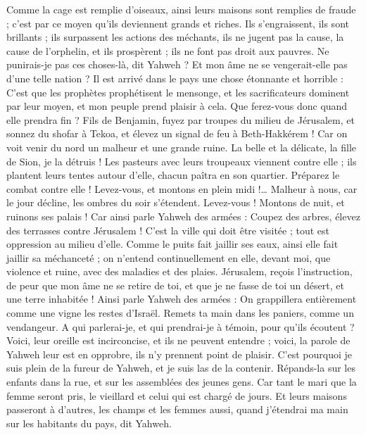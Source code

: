 \begin{multicols}{2}
Comme la cage est remplie d'oiseaux, ainsi leurs maisons sont remplies de fraude ; c'est par ce moyen qu'ils deviennent grands et riches.
Ils s'engraissent, ils sont brillants ; ils surpassent les actions des méchants, ils ne jugent pas la cause, la cause de l'orphelin, et ils prospèrent ; ils ne font pas droit aux pauvres.
Ne punirais-je pas ces choses-là, dit Yahweh ? Et mon âme ne se vengerait-elle pas d'une telle nation ?
Il est arrivé dans le pays une chose étonnante et horrible :
C'est que les prophètes prophétisent le mensonge, et les sacrificateurs dominent par leur moyen, et mon peuple prend plaisir à cela. Que ferez-vous donc quand elle prendra fin ?
\VerseOne{}Fils de Benjamin, fuyez par troupes du milieu de Jérusalem, et sonnez du shofar à Tekoa, et élevez un signal de feu à Beth-Hakkérem ! Car on voit venir du nord un malheur et une grande ruine.
La belle et la délicate, la fille de Sion, je la détruis !
Les pasteurs avec leurs troupeaux viennent contre elle ; ils plantent leurs tentes autour d'elle, chacun paîtra en son quartier.
Préparez le combat contre elle ! Levez-vous, et montons en plein midi !… Malheur à nous, car le jour décline, les ombres du soir s'étendent.
Levez-vous ! Montons de nuit, et ruinons ses palais !
Car ainsi parle Yahweh des armées : Coupez des arbres, élevez des terrasses contre Jérusalem ! C'est la ville qui doit être visitée ; tout est oppression au milieu d'elle.
Comme le puits fait jaillir ses eaux, ainsi elle fait jaillir sa méchanceté ; on n'entend continuellement en elle, devant moi, que violence et ruine, avec des maladies et des plaies.
Jérusalem, reçois l'instruction, de peur que mon âme ne se retire de toi, et que je ne fasse de toi un désert, et une terre inhabitée !
Ainsi parle Yahweh des armées : On grappillera entièrement comme une vigne les restes d'Israël. Remets ta main dans les paniers, comme un vendangeur.
A qui parlerai-je, et qui prendrai-je à témoin, pour qu'ils écoutent ? Voici, leur oreille est incirconcise, et ils ne peuvent entendre ; voici, la parole de Yahweh leur est en opprobre, ils n'y prennent point de plaisir.
C'est pourquoi je suis plein de la fureur de Yahweh, et je suis las de la contenir. Répands-la sur les enfants dans la rue, et sur les assemblées des jeunes gens. Car tant le mari que la femme seront pris, le vieillard et celui qui est chargé de jours.
Et leurs maisons passeront à d'autres, les champs et les femmes aussi, quand j'étendrai ma main sur les habitants du pays, dit Yahweh.

\end{multicols}
